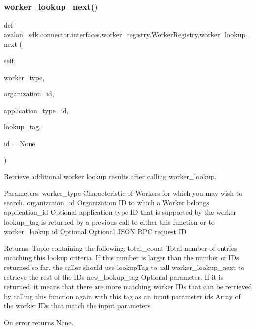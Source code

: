 \subsubsection{\texorpdfstring{worker\+\_\+lookup\+\_\+next()}{worker\_lookup\_next()}}
{\footnotesize\ttfamily def avalon\+\_\+sdk.\+connector.\+interfaces.\+worker\+\_\+registry.\+Worker\+Registry.\+worker\+\_\+lookup\+\_\+next (\begin{DoxyParamCaption}\item[{}]{self,  }\item[{}]{worker\+\_\+type,  }\item[{}]{organization\+\_\+id,  }\item[{}]{application\+\_\+type\+\_\+id,  }\item[{}]{lookup\+\_\+tag,  }\item[{}]{id = {\ttfamily None} }\end{DoxyParamCaption})}

\begin{DoxyVerb}Retrieve additional worker lookup results after calling worker_lookup.

Parameters:
worker_type         Characteristic of Workers for which you may wish
            to search.
organization_id     Organization ID to which a Worker belongs
application_id      Optional application type ID that is
            supported by the worker
lookup_tag          is returned by a previous call to either this
            function or to worker_lookup
id                  Optional Optional JSON RPC request ID


Returns:
Tuple containing the following:
total_count    Total number of entries matching this lookup
       criteria.  If this number is larger than the number
       of IDs returned so far, the caller should use
       lookupTag to call worker_lookup_next to retrieve
       the rest of the IDs
new_lookup_tag Optional parameter. If it is returned, it
       means that there are more matching worker IDs that
       can be retrieved by calling this function again with
       this tag as an input parameter
ids            Array of the worker IDs that match the input parameters

On error returns None.
\end{DoxyVerb}
 \mbox{\label{classavalon__sdk_1_1connector_1_1interfaces_1_1worker__registry_1_1WorkerRegistry_a801481926e5dc9fc36ce7ec5a8166629}} 
